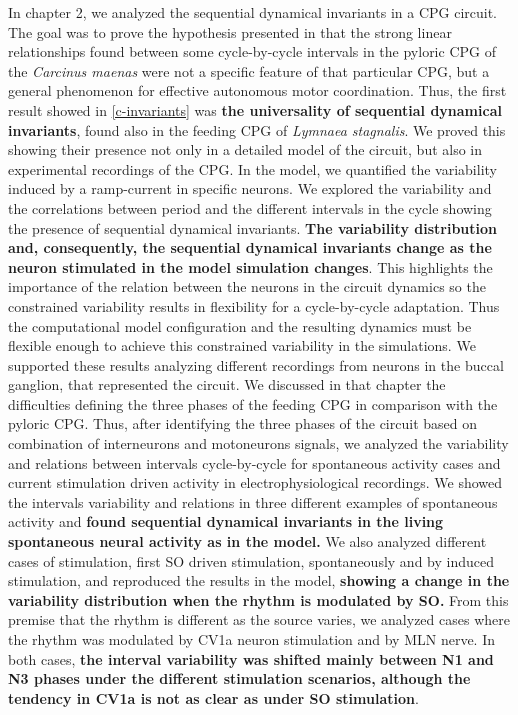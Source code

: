 	
In chapter 2, we analyzed the sequential dynamical invariants in a CPG circuit. The goal was to prove the hypothesis presented in \cite{elices_robust_2019} that the strong linear relationships found between some cycle-by-cycle intervals in the pyloric CPG of the \textit{Carcinus maenas} were not a specific feature of that particular CPG, but a general phenomenon for effective autonomous motor coordination. Thus, the first result showed in \ref{c-invariants} was \textbf{the universality of sequential dynamical invariants}, found also in the feeding CPG of \textit{Lymnaea stagnalis}. We proved this showing their presence not only in a detailed model of the circuit, but also in experimental recordings of the CPG. In the model, we quantified the variability induced by a ramp-current in specific neurons. We explored the variability and the correlations between period and the different intervals in the cycle showing the presence of sequential dynamical invariants.  \textbf{The variability distribution and, consequently, the sequential dynamical invariants change as the neuron stimulated in the model simulation changes}. This highlights the importance of the relation between the neurons in the circuit dynamics so the constrained variability results in flexibility for a cycle-by-cycle adaptation. Thus the computational model configuration and the resulting dynamics must be flexible enough to achieve this constrained variability in the simulations. We supported these results analyzing different recordings from neurons in the buccal ganglion, that represented the circuit. We discussed in that chapter the difficulties defining the three phases of the feeding CPG in comparison with the pyloric CPG. Thus, after identifying the three phases of the circuit based on combination of interneurons and motoneurons signals, we analyzed the variability and relations between intervals cycle-by-cycle for spontaneous activity cases and current stimulation driven activity in electrophysiological recordings. We showed the intervals variability and relations in three different examples of spontaneous activity and \textbf{found sequential dynamical invariants in the living spontaneous neural activity as in the model.} We also analyzed different cases of stimulation, first SO driven stimulation, spontaneously and by induced stimulation, and reproduced the results in the model, \textbf{showing a change in the variability distribution when the rhythm is modulated by SO.} From this premise that the rhythm is different as the source varies, we analyzed cases where the rhythm was modulated by CV1a neuron stimulation and by MLN nerve. In both cases, \textbf{the interval variability was shifted mainly between N1 and N3 phases under the different stimulation scenarios, although the tendency in CV1a is not as clear as under SO stimulation}.

